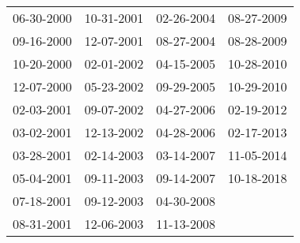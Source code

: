 \begin{supertabular}{llll}
 06-30-2000 &  10-31-2001 &  02-26-2004 &  08-27-2009 \\
 09-16-2000 &  12-07-2001 &  08-27-2004 &  08-28-2009 \\
 10-20-2000 &  02-01-2002 &  04-15-2005 &  10-28-2010 \\
 12-07-2000 &  05-23-2002 &  09-29-2005 &  10-29-2010 \\
 02-03-2001 &  09-07-2002 &  04-27-2006 &  02-19-2012 \\
 03-02-2001 &  12-13-2002 &  04-28-2006 &  02-17-2013 \\
 03-28-2001 &  02-14-2003 &  03-14-2007 &  11-05-2014 \\
 05-04-2001 &  09-11-2003 &  09-14-2007 &  10-18-2018 \\
 07-18-2001 &  09-12-2003 &  04-30-2008 &             \\
 08-31-2001 &  12-06-2003 &  11-13-2008 &             \\
\end{supertabular}
